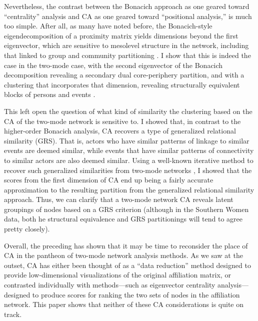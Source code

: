 \documentclass[a4paper,fleqn]{cas-sc}
\begin{document}
Nevertheless, the contrast between the Bonacich approach as one geared toward ``centrality'' analysis and CA as one geared toward ``positional analysis,'' is much too simple. After all, as many have noted before, the Bonacich-style eigendecomposition of a proximity matrix yields dimensions beyond the first eigenvector, which are sensitive to mesolevel structure in the network, including that linked to group and community partitioning \citep{iacobucci2017eigenvector}. I show that this is indeed the case in the two-mode case, with the second eigenvector of the Bonacich decomposition revealing a secondary dual core-periphery partition, and with a clustering that incorporates that dimension, revealing structurally equivalent blocks of persons and events \citep{everett2013dual}.

This left open the question of what kind of similarity the clustering based on the CA of the two-mode network is sensitive to. I showed that, in contrast to the higher-order Bonacich analysis, CA recovers a type of generalized relational similarity (GRS). That is, actors who have similar patterns of linkage to similar events are deemed similar, while events that have similar patterns of connectivity to similar actors are also deemed similar. Using a well-known iterative method to recover such generalized similarities from two-mode networks \citep{jeh2002simrank}, I showed that the scores from the first dimension of CA end up being a fairly accurate approximation to the resulting partition from the generalized relational similarity approach. Thus, we can clarify that a two-mode network CA reveals latent groupings of nodes based on a GRS criterion (although in the Southern Women data, both he structural equivalence and GRS partitionings will tend to agree pretty closely). 

Overall, the preceding has shown that it may be time to reconsider the place of CA in the pantheon of two-mode network analysis methods. As we saw at the outset, CA has either been thought of as a ``data reduction'' method designed to provide low-dimensional visualizations of the original affiliation matrix, or contrasted individually with methods---such as eigenvector centrality analysis---designed to produce scores for ranking the two sets of nodes in the affiliation network. This paper shows that neither of these CA considerations is quite on track. 
\end{document}
